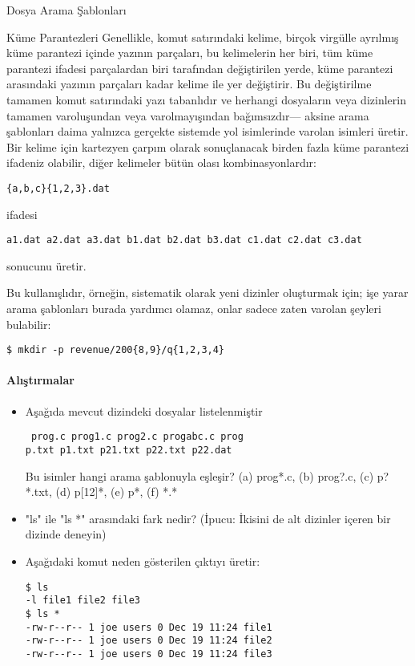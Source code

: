 \documentclass[10pt,a5paper]{book}
\begin{document}
\begin{section}{Dosya Arama Şablonları}
\begin{subsection}{Küme Parantezleri}
Genellikle, komut satırındaki kelime, birçok virgülle ayrılmış küme parantezi içinde yazının parçaları, bu kelimelerin her biri, tüm küme parantezi ifadesi parçalardan biri tarafından değiştirilen yerde, küme parantezi arasındaki yazının parçaları kadar kelime ile yer değiştirir. Bu değiştirilme tamamen komut satırındaki yazı tabanlıdır ve herhangi dosyaların veya dizinlerin tamamen varoluşundan veya varolmayışından bağımsızdır— aksine arama şablonları daima yalnızca gerçekte sistemde yol isimlerinde varolan isimleri üretir.
Bir kelime için kartezyen çarpım olarak sonuçlanacak birden fazla küme parantezi ifadeniz olabilir, diğer kelimeler bütün olası kombinasyonlardır:
\begin{verbatim}
{a,b,c}{1,2,3}.dat
\end{verbatim}
ifadesi
\begin{verbatim}
a1.dat a2.dat a3.dat b1.dat b2.dat b3.dat c1.dat c2.dat c3.dat
\end{verbatim}
sonucunu üretir.

Bu kullanışlıdır, örneğin, sistematik olarak yeni dizinler oluşturmak için; işe yarar arama şablonları burada yardımcı olamaz, onlar sadece zaten varolan şeyleri bulabilir:
\begin{verbatim}
$ mkdir -p revenue/200{8,9}/q{1,2,3,4}
\end{verbatim}
\paragraph{Alıştırmalar}{
\begin{itemize}
 \item Aşağıda mevcut dizindeki dosyalar listelenmiştir\begin{verbatim}
 prog.c prog1.c prog2.c progabc.c prog
p.txt p1.txt p21.txt p22.txt p22.dat
 \end{verbatim}Bu isimler hangi arama şablonuyla eşleşir? (a) prog*.c, (b) prog?.c, (c) p?*.txt, (d) p[12]*, (e) p*, (f) *.*
 \item "ls" ile "ls *" arasındaki fark nedir? (İpucu: İkisini de alt dizinler içeren bir dizinde deneyin)
 \item Aşağıdaki komut neden gösterilen çıktıyı üretir:\begin{verbatim}
$ ls
-l file1 file2 file3
$ ls *
-rw-r--r-- 1 joe users 0 Dec 19 11:24 file1
-rw-r--r-- 1 joe users 0 Dec 19 11:24 file2
-rw-r--r-- 1 joe users 0 Dec 19 11:24 file3
 \end{verbatim}
\end{itemize}}

\end{subsection}
\end{section}
\end{document}
